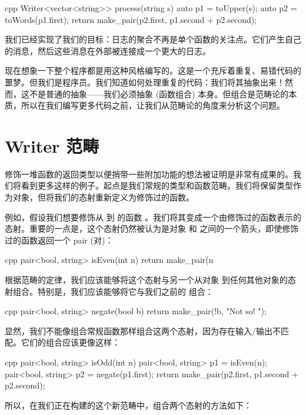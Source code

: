 \begin{snip}{cpp}
Writer<vector<string>> process(string s) {
    auto p1 = toUpper(s);
    auto p2 = toWords(p1.first);
    return make_pair(p2.first, p1.second + p2.second);
}
\end{snip}
我们已经实现了我们的目标：日志的聚合不再是单个函数的关注点。它们产生自己的消息，然后这些消息在外部被连接成一个更大的日志。

现在想象一下整个程序都是用这种风格编写的。这是一个充斥着重复、易错代码的噩梦。但我们是程序员。我们知道如何处理重复的代码：我们将其抽象出来！然而，这不是普通的抽象——我们必须抽象  (函数组合) 本身。但组合是范畴论的本质，所以在我们编写更多代码之前，让我们从范畴论的角度来分析这个问题。

\section{Writer 范畴}

修饰一堆函数的返回类型以便捎带一些附加功能的想法被证明是非常有成果的。我们将看到更多这样的例子。起点是我们常规的类型和函数范畴。我们将保留类型作为对象，但将我们的态射重新定义为修饰过的函数。

例如，假设我们想要修饰从  到  的函数 。我们将其变成一个由修饰过的函数表示的态射。重要的一点是，这个态射仍然被认为是对象  和  之间的一个箭头，即使修饰过的函数返回一个 pair (对)：

\begin{snip}{cpp}
pair<bool, string> isEven(int n) {
    return make_pair(n %
}
\end{snip}
根据范畴的定律，我们应该能够将这个态射与另一个从对象  到任何其他对象的态射组合。特别是，我们应该能够将它与我们之前的  组合：

\begin{snip}{cpp}
pair<bool, string> negate(bool b) {
    return make_pair(!b, "Not so! ");
}
\end{snip}
显然，我们不能像组合常规函数那样组合这两个态射，因为存在输入/输出不匹配。它们的组合应该更像这样：

\begin{snip}{cpp}
pair<bool, string> isOdd(int n) {
    pair<bool, string> p1 = isEven(n);
    pair<bool, string> p2 = negate(p1.first);
    return make_pair(p2.first, p1.second + p2.second);
}
\end{snip}
所以，在我们正在构建的这个新范畴中，组合两个态射的方法如下：

